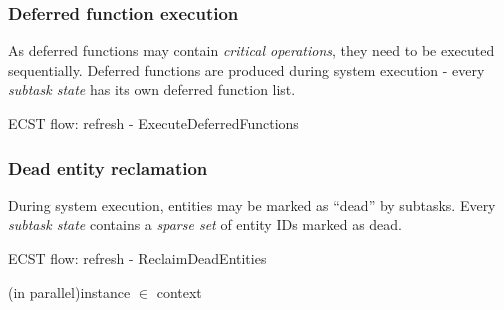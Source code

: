 \documentclass[twoside, 12pt, a4paper, openright]{book}
\begin{document}
\hypertarget{flow_exec_dfuncs}{\subsubsection{Deferred function
execution}\label{flow_exec_dfuncs}}

As deferred functions may contain \emph{critical operations}, they need
to be executed sequentially. Deferred functions are produced during
system execution - every \emph{subtask state} has its own deferred
function list.

\begin{algorithm}[H]
\caption{ECST flow: refresh - ExecuteDeferredFunctions}
\footnotesize



\end{algorithm}

\subsubsection{Dead entity reclamation}\label{dead-entity-reclamation}

During system execution, entities may be marked as ``dead'' by subtasks.
Every \emph{subtask state} contains a \emph{sparse set} of entity IDs
marked as dead.

\begin{algorithm}[H]
\caption{ECST flow: refresh - ReclaimDeadEntities}
\footnotesize



    \BlankLine

    \ForEach(in parallel){instance \I $\in$ context \C}{
    }

    \BlankLine


\end{algorithm}
\end{document}
